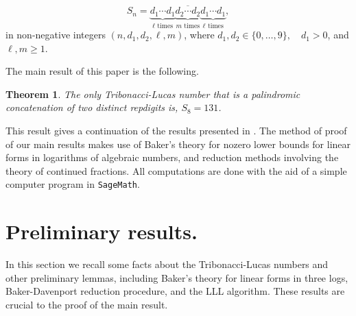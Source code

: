 \documentclass[10pt,a4paper]{article}
\newtheorem{theorem}{Theorem}
\begin{document}
\begin{equation}\label{eq1}
S_n = \overline{\underbrace{d_1\cdots d_1}_\text{$\ell$ times} \underbrace{d_2\cdots d_2}_\text{$m$ times} \underbrace{d_1\cdots d_1}_\text{$\ell$ times}}, 
\end{equation}
in non-negative integers $ (n,d_1,d_2,\ell, m )$, where $ d_1,d_2 \in \{0, \ldots, 9  \}, \quad d_1 > 0$, and $ \ell,m\ge 1 $. 

\noindent The main result of this paper is the following.

\begin{theorem}\label{thm1x}
The only Tribonacci-Lucas number that is a palindromic concatenation of two distinct repdigits is,  $ S_8=131 $.
\end{theorem}
\noindent
This result gives a continuation of the results presented  in \cite{MD, MD3}. The method of proof of our main results makes use of Baker's theory for nozero lower bounds for linear forms in logarithms of algebraic numbers, and reduction methods involving the theory of continued fractions. All computations are done with the aid of a simple computer program in {\tt SageMath}.

\section{Preliminary results.}

\noindent In this section we recall some facts about the Tribonacci-Lucas numbers and other preliminary lemmas, including Baker's theory for linear forms in three logs, Baker-Davenport reduction procedure, and the LLL algorithm.  These results are crucial to the proof of the main result.
\end{document}
